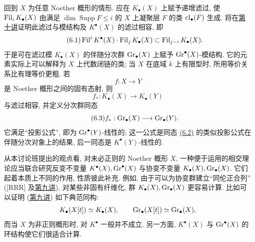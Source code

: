 回到 $X$ 为任意 Noether 概形的情形. 应在 $K_\bullet(X)$ 上赋予递增滤过, 使 $\operatorname{Fil}_iK_\bullet(X)$ 由满足 $\dim\operatorname{Supp}F\le i$ 的 $X$ 上凝聚层 $F$ 的类 $\operatorname{cl}_\bullet(F)$ 生成. 将在\hyperlink{sga6.e10.expose}{第十讲}证明此滤过与模结构及 $K^\bullet(X)$ 的滤过相容, 即
\begin{equation}\tag{6.1}
\operatorname{Fil}^iK^\bullet(X)\cdot \operatorname{Fil}_jK_\bullet(X)\subset \operatorname{Fil}_{j-i}K_\bullet(X).
\end{equation}
于是可在滤过模 $K_\bullet(X)$ 的伴随分次群 $\operatorname{Gr}_\bullet(X)$ 上赋予 $\operatorname{Gr}^\bullet(X)$-模结构. 它的元素实际上可以解释为 $X$ 上代数闭链的类; 当 $X$ 在底域 $k$ 上有限型时, 所用等价关系比有理等价更粗. 若
\[
f:X\longrightarrow Y
\]
是 Noether 概形之间的固有态射, 则
\begin{equation}\tag{6.2}
f_*:K_\bullet(X)\longrightarrow K_\bullet(Y)
\end{equation}
与滤过相容, 并定义分次群同态
\begin{equation}\tag{6.3}
f_*:\operatorname{Gr}_\bullet(X)\longrightarrow \operatorname{Gr}_\bullet(Y).
\end{equation}
它满足“投影公式”, 即为 $\operatorname{Gr}^\bullet(Y)$-线性的; 这一公式是同态 \hyperlink{sga6.e00.eq.6-2}{(6.2)} 的类似投影公式在伴随分次对象上的结果, 后一同态是 $K^\bullet(Y)$-线性的.

从本讨论班提出的观点看, 对未必正则的 Noether 概形 $X$, 一种便于运用的相交理论应当联合研究反变不变量 $K^\bullet(X),\operatorname{Gr}^\bullet(X)$ 与协变不变量 $K_\bullet(X),\operatorname{Gr}_\bullet(X)$. 它们起着本质上不同的作用, 性质彼此补充. 例如, 由于可以为协变群建立“同伦正合列” ([RRR] 及\hyperlink{sga6.e09.expose}{第九讲}), 对某些非固有纤维化, 群 $K_\bullet(X),\operatorname{Gr}_\bullet(X)$ 更容易计算. 比如可以证明 (\hyperlink{sga6.e09.expose}{第九讲}) 如下典范同构:
\[
K_\bullet(X[t])\simeq K_\bullet(X),\qquad \operatorname{Gr}_\bullet(X[t])\simeq \operatorname{Gr}_\bullet(X),
\]
而当 $X$ 为非正则概形时, 对 $K^\bullet$ 一般并不成立. 另一方面, $K^\bullet(X)$ 与 $\operatorname{Gr}^\bullet(X)$ 的环结构使它们很适合计算.

